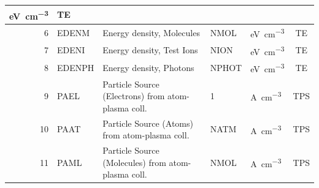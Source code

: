 \begin{landscape}
\begin{longtable}{|r|l|l|l|l|c|}
    \si{\electronvolt\per\cubic\centi\metre}                       & TE
    \\ \hline
    6                                                              & EDENM
                                                                   & Energy density, Molecules
                                                                   & NMOL                      &
    \si{\electronvolt\per\cubic\centi\metre}                       & TE
    \\ \hline
    7                                                              & EDENI
                                                                   & Energy density, Test Ions
                                                                   & NION                      &
    \si{\electronvolt\per\cubic\centi\metre}                       & TE
    \\ \hline
    8                                                              & EDENPH
                                                                   & Energy density, Photons
                                                                   & NPHOT                     &
    \si{\electronvolt\per\cubic\centi\metre}                       & TE
    \\ \hline
    9                                                              & PAEL
                                                                   & Particle Source
    (Electrons) from atom-plasma coll.
                                                                   & 1
                                                                   &
    \si{\ampere\per\cubic\centi\metre}                             & TPS
    \\ \hline
    10                                                             & PAAT
                                                                   & Particle Source (Atoms)
    from atom-plasma coll.
                                                                   & NATM
                                                                   &
    \si{\ampere\per\cubic\centi\metre}                             & TPS
    \\ \hline
    11                                                             & PAML
                                                                   & Particle Source
    (Molecules) from atom-plasma coll.
                                                                   & NMOL
                                                                   &
    \si{\ampere\per\cubic\centi\metre}                             & TPS

\end{longtable}
\end{landscape}
